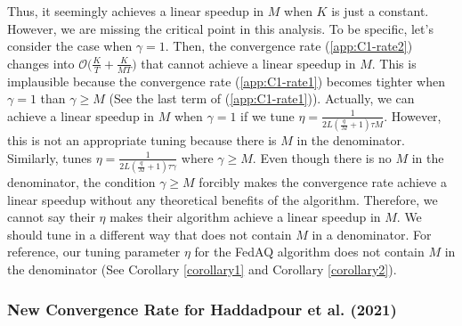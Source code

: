 \documentclass[11pt]{article}
\begin{document}
Thus, it seemingly achieves a linear speedup in $M$ when $K$ is just a constant. However, we are missing the critical point in this analysis. To be specific, let's consider the case when $\gamma = 1$. Then, the convergence rate (\ref{app:C1-rate2}) changes into $\mathcal{O}\Big( \frac{K}{T} + \frac{K}{MT}\Big)$ that cannot achieve a linear speedup in $M$. This is implausible because the convergence rate (\ref{app:C1-rate1}) becomes tighter when $\gamma = 1$ than $\gamma \geq M$ (See the last term of (\ref{app:C1-rate1})). Actually, we can achieve a linear speedup in $M$ when $\gamma = 1$ if we tune $\eta = \frac{1}{2L(\frac{q}{M}+1)\tau M}$. However, this is not an appropriate tuning because there is $M$ in the denominator. Similarly, \cite{Yeojoon-haddadpour2021federated} tunes $\eta = \frac{1}{2L(\frac{q}{M}+1)\tau\gamma}$ where $\gamma \geq M$. Even though there is no $M$ in the denominator, the condition $\gamma \geq M$ forcibly makes the convergence rate achieve a linear speedup without any theoretical benefits of the algorithm. Therefore, we cannot say their $\eta$ makes their algorithm achieve a linear speedup in $M$. We should tune in a different way that does not contain $M$ in a denominator. For reference, our tuning parameter $\eta$ for the FedAQ algorithm does not contain $M$ in the denominator (See Corollary \ref{corollary1} and Corollary \ref{corollary2}).

\subsubsection{New Convergence Rate for Haddadpour et al. (2021)}
\end{document}

